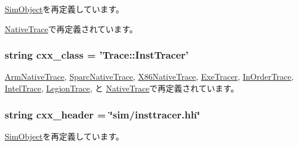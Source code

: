 \hyperlink{classm5_1_1SimObject_1_1SimObject_a17fa61ac3806b481cafee5593b55e5d0}{SimObject}を再定義しています。

\hyperlink{classNativeTrace_1_1NativeTrace_a17fa61ac3806b481cafee5593b55e5d0}{NativeTrace}で再定義されています。\hypertarget{classInstTracer_1_1InstTracer_a58cd55cd4023648e138237cfc0822ae3}{
\subsubsection[{cxx\_\-class}]{\setlength{\rightskip}{0pt plus 5cm}string {\bf cxx\_\-class} = '{\bf Trace::InstTracer}'}}
\label{classInstTracer_1_1InstTracer_a58cd55cd4023648e138237cfc0822ae3}


\hyperlink{classArmNativeTrace_1_1ArmNativeTrace_a58cd55cd4023648e138237cfc0822ae3}{ArmNativeTrace}, \hyperlink{classSparcNativeTrace_1_1SparcNativeTrace_a58cd55cd4023648e138237cfc0822ae3}{SparcNativeTrace}, \hyperlink{classX86NativeTrace_1_1X86NativeTrace_a58cd55cd4023648e138237cfc0822ae3}{X86NativeTrace}, \hyperlink{classExeTracer_1_1ExeTracer_a58cd55cd4023648e138237cfc0822ae3}{ExeTracer}, \hyperlink{classInOrderTrace_1_1InOrderTrace_a58cd55cd4023648e138237cfc0822ae3}{InOrderTrace}, \hyperlink{classIntelTrace_1_1IntelTrace_a58cd55cd4023648e138237cfc0822ae3}{IntelTrace}, \hyperlink{classLegionTrace_1_1LegionTrace_a58cd55cd4023648e138237cfc0822ae3}{LegionTrace}, と \hyperlink{classNativeTrace_1_1NativeTrace_a58cd55cd4023648e138237cfc0822ae3}{NativeTrace}で再定義されています。\hypertarget{classInstTracer_1_1InstTracer_a17da7064bc5c518791f0c891eff05fda}{
\subsubsection[{cxx\_\-header}]{\setlength{\rightskip}{0pt plus 5cm}string {\bf cxx\_\-header} = \char`\"{}sim/insttracer.hh\char`\"{}}}
\label{classInstTracer_1_1InstTracer_a17da7064bc5c518791f0c891eff05fda}


\hyperlink{classm5_1_1SimObject_1_1SimObject_a17da7064bc5c518791f0c891eff05fda}{SimObject}を再定義しています。

